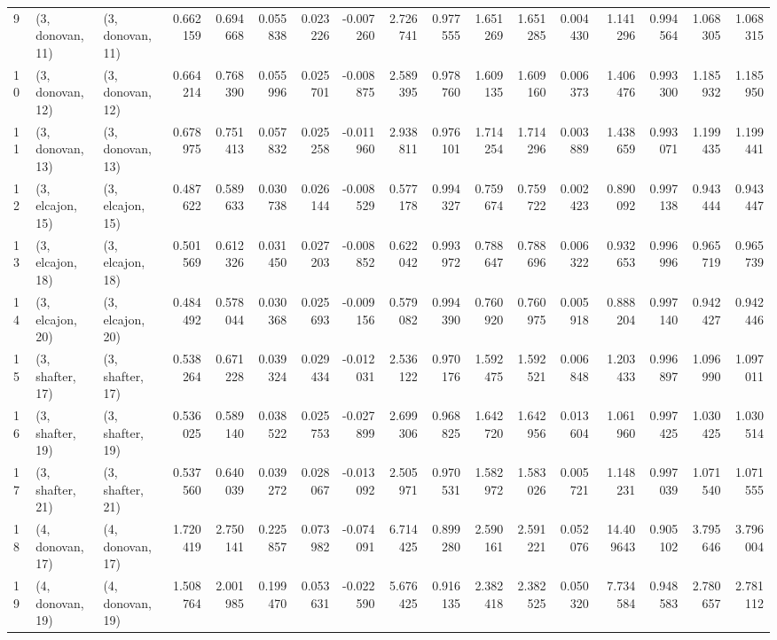 \begin{tabular}{lllrrrrrrrrrrrrrr}
9  &  (3, donovan, 11) &  (3, donovan, 11) &  0.662159 &  0.694668 &   0.055838 &  0.023226 & -0.007260 &  2.726741 &  0.977555 &   1.651269 &  1.651285 &  0.004430 &   1.141296 &  0.994564 &  1.068305 &  1.068315 \\
10 &  (3, donovan, 12) &  (3, donovan, 12) &  0.664214 &  0.768390 &   0.055996 &  0.025701 & -0.008875 &  2.589395 &  0.978760 &   1.609135 &  1.609160 &  0.006373 &   1.406476 &  0.993300 &  1.185932 &  1.185950 \\
11 &  (3, donovan, 13) &  (3, donovan, 13) &  0.678975 &  0.751413 &   0.057832 &  0.025258 & -0.011960 &  2.938811 &  0.976101 &   1.714254 &  1.714296 &  0.003889 &   1.438659 &  0.993071 &  1.199435 &  1.199441 \\
12 &  (3, elcajon, 15) &  (3, elcajon, 15) &  0.487622 &  0.589633 &   0.030738 &  0.026144 & -0.008529 &  0.577178 &  0.994327 &   0.759674 &  0.759722 &  0.002423 &   0.890092 &  0.997138 &  0.943444 &  0.943447 \\
13 &  (3, elcajon, 18) &  (3, elcajon, 18) &  0.501569 &  0.612326 &   0.031450 &  0.027203 & -0.008852 &  0.622042 &  0.993972 &   0.788647 &  0.788696 &  0.006322 &   0.932653 &  0.996996 &  0.965719 &  0.965739 \\
14 &  (3, elcajon, 20) &  (3, elcajon, 20) &  0.484492 &  0.578044 &   0.030368 &  0.025693 & -0.009156 &  0.579082 &  0.994390 &   0.760920 &  0.760975 &  0.005918 &   0.888204 &  0.997140 &  0.942427 &  0.942446 \\
15 &  (3, shafter, 17) &  (3, shafter, 17) &  0.538264 &  0.671228 &   0.039324 &  0.029434 & -0.012031 &  2.536122 &  0.970176 &   1.592475 &  1.592521 &  0.006848 &   1.203433 &  0.996897 &  1.096990 &  1.097011 \\
16 &  (3, shafter, 19) &  (3, shafter, 19) &  0.536025 &  0.589140 &   0.038522 &  0.025753 & -0.027899 &  2.699306 &  0.968825 &   1.642720 &  1.642956 &  0.013604 &   1.061960 &  0.997425 &  1.030425 &  1.030514 \\
17 &  (3, shafter, 21) &  (3, shafter, 21) &  0.537560 &  0.640039 &   0.039272 &  0.028067 & -0.013092 &  2.505971 &  0.970531 &   1.582972 &  1.583026 &  0.005721 &   1.148231 &  0.997039 &  1.071540 &  1.071555 \\
18 &  (4, donovan, 17) &  (4, donovan, 17) &  1.720419 &  2.750141 &   0.225857 &  0.073982 & -0.074091 &  6.714425 &  0.899280 &   2.590161 &  2.591221 &  0.052076 &  14.409643 &  0.905102 &  3.795646 &  3.796004 \\
19 &  (4, donovan, 19) &  (4, donovan, 19) &  1.508764 &  2.001985 &   0.199470 &  0.053631 & -0.022590 &  5.676425 &  0.916135 &   2.382418 &  2.382525 &  0.050320 &   7.734584 &  0.948583 &  2.780657 &  2.781112 \\

\end{tabular}

